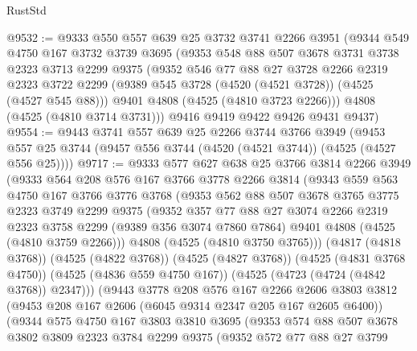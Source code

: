 \begin{lexlean}{RustStd}
\begin{coremodule}
{\begin{coremodule}
{{{{{{{{{{{{{{@9532 := @9333
    @550
    @557
    @639
    @25
    @3732
    @3741
    @2266
    @3951
    (@9344
      @549
      @4750
      @167
      @3732
      @3739
      @3695
      (@9353
        @548
        @88
        @507
        @3678
        @3731
        @3738
        @2323
        @3713
        @2299
        @9375
        (@9352
          @546
          @77
          @88
          @27
          @3728
          @2266
          @2319
          @2323
          @3722
          @2299
          (@9389 @545 @3728 (@4520 (@4521 @3728)) (@4525 (@4527 @545 @88)))
          @9401
          @4808
          (@4525 (@4810 @3723 @2266)))
        @4808
        (@4525 (@4810 @3714 @3731)))
      @9416
      @9419
      @9422
      @9426
      @9431
      @9437)
@9554 := @9443
    @3741
    @557
    @639
    @25
    @2266
    @3744
    @3766
    @3949
    (@9453 @557 @25 @3744 (@9457 @556 @3744 (@4520 (@4521 @3744)) (@4525 (@4527 @556 @25))))
@9717 := @9333
    @577
    @627
    @638
    @25
    @3766
    @3814
    @2266
    @3949
    (@9333
      @564
      @208
      @576
      @167
      @3766
      @3778
      @2266
      @3814
      (@9343
        @559
        @563
        @4750
        @167
        @3766
        @3776
        @3768
        (@9353
          @562
          @88
          @507
          @3678
          @3765
          @3775
          @2323
          @3749
          @2299
          @9375
          (@9352
            @357
            @77
            @88
            @27
            @3074
            @2266
            @2319
            @2323
            @3758
            @2299
            (@9389 @356 @3074 @7860 @7864)
            @9401
            @4808
            (@4525 (@4810 @3759 @2266)))
          @4808
          (@4525 (@4810 @3750 @3765)))
        (@4817 (@4818 @3768))
        (@4525 (@4822 @3768))
        (@4525 (@4827 @3768))
        (@4525 (@4831 @3768 @4750))
        (@4525 (@4836 @559 @4750 @167))
        (@4525 (@4723 (@4724 (@4842 @3768)) @2347)))
      (@9443
        @3778
        @208
        @576
        @167
        @2266
        @2606
        @3803
        @3812
        (@9453 @208 @167 @2606 (@6045 @9314 @2347 @205 @167 @2605 @6400))
        (@9344
          @575
          @4750
          @167
          @3803
          @3810
          @3695
          (@9353
            @574
            @88
            @507
            @3678
            @3802
            @3809
            @2323
            @3784
            @2299
            @9375
            (@9352
              @572
              @77
              @88
              @27
              @3799
}}}}}}}}}}}}}}
\end{coremodule}}
\end{coremodule}
\end{lexlean}
